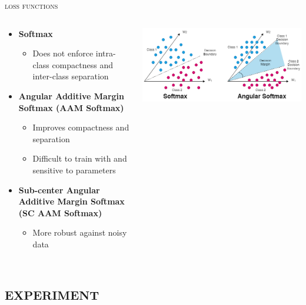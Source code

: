 \documentclass[10pt,aspectratio=1610,professionalfont]{beamer}
\begin{document}
\begin{frame}{\textsc{loss functions}}
    \begin{columns}
		\begin{column}{0.4\textwidth}
		\begin{itemize}
	        \item \textbf{Softmax}
		  \begin{itemize}
	            \item  Does not enforce intra-class compactness and inter-class separation
	        \end{itemize}
		  \item \textbf{Angular Additive Margin Softmax (AAM Softmax)}
		  \begin{itemize}
		      \item Improves compactness and separation
	            \item  Difficult to train with and sensitive to parameters
	        \end{itemize}
		  \item \textbf{Sub-center Angular Additive Margin Softmax (SC AAM Softmax)}
		   \begin{itemize}
	            \item  More robust against noisy data
	        \end{itemize}
	    \end{itemize}
		\end{column}
		\begin{column}{0.6\textwidth} 
		\begin{center}
		     	\includegraphics[width=1.0\textwidth]{img/softmax.png}
		\end{center}
		\end{column}
	\end{columns}
    
\end{frame}

\section{\textsc{experiment}}
\end{document}
